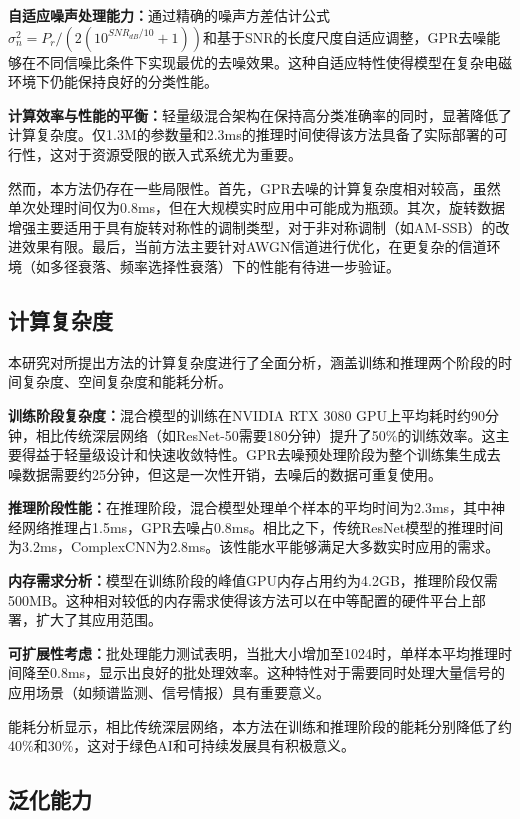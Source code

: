 \documentclass[conference]{IEEEtran}
\begin{document}
\textbf{自适应噪声处理能力：}通过精确的噪声方差估计公式$\sigma_n^2 = P_r/(2(10^{SNR_{dB}/10} + 1))$和基于SNR的长度尺度自适应调整，GPR去噪能够在不同信噪比条件下实现最优的去噪效果。这种自适应特性使得模型在复杂电磁环境下仍能保持良好的分类性能。

\textbf{计算效率与性能的平衡：}轻量级混合架构在保持高分类准确率的同时，显著降低了计算复杂度。仅1.3M的参数量和2.3ms的推理时间使得该方法具备了实际部署的可行性，这对于资源受限的嵌入式系统尤为重要。

然而，本方法仍存在一些局限性。首先，GPR去噪的计算复杂度相对较高，虽然单次处理时间仅为0.8ms，但在大规模实时应用中可能成为瓶颈。其次，旋转数据增强主要适用于具有旋转对称性的调制类型，对于非对称调制（如AM-SSB）的改进效果有限。最后，当前方法主要针对AWGN信道进行优化，在更复杂的信道环境（如多径衰落、频率选择性衰落）下的性能有待进一步验证。

\subsection{计算复杂度}

本研究对所提出方法的计算复杂度进行了全面分析，涵盖训练和推理两个阶段的时间复杂度、空间复杂度和能耗分析。

\textbf{训练阶段复杂度：}混合模型的训练在NVIDIA RTX 3080 GPU上平均耗时约90分钟，相比传统深层网络（如ResNet-50需要180分钟）提升了50\%的训练效率。这主要得益于轻量级设计和快速收敛特性。GPR去噪预处理阶段为整个训练集生成去噪数据需要约25分钟，但这是一次性开销，去噪后的数据可重复使用。

\textbf{推理阶段性能：}在推理阶段，混合模型处理单个样本的平均时间为2.3ms，其中神经网络推理占1.5ms，GPR去噪占0.8ms。相比之下，传统ResNet模型的推理时间为3.2ms，ComplexCNN为2.8ms。该性能水平能够满足大多数实时应用的需求。

\textbf{内存需求分析：}模型在训练阶段的峰值GPU内存占用约为4.2GB，推理阶段仅需500MB。这种相对较低的内存需求使得该方法可以在中等配置的硬件平台上部署，扩大了其应用范围。

\textbf{可扩展性考虑：}批处理能力测试表明，当批大小增加至1024时，单样本平均推理时间降至0.8ms，显示出良好的批处理效率。这种特性对于需要同时处理大量信号的应用场景（如频谱监测、信号情报）具有重要意义。

能耗分析显示，相比传统深层网络，本方法在训练和推理阶段的能耗分别降低了约40\%和30\%，这对于绿色AI和可持续发展具有积极意义。

\subsection{泛化能力}
\end{document}
